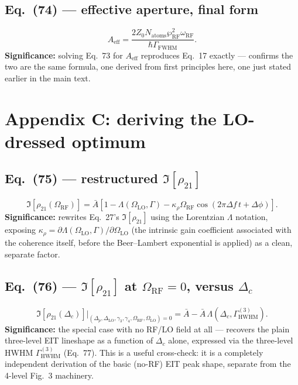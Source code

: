 \documentclass[11pt]{article}
\begin{document}
\subsection*{Eq.~(74) --- effective aperture, final form}
\begin{equation}
A_\text{eff} = \frac{2Z_0N_\text{atoms}\wp_\text{RF}^2\omega_\text{RF}}{\hbar\Gamma_\text{FWHM}}. \tag{74}
\end{equation}
\textbf{Significance:} solving Eq.~73 for $A_\text{eff}$ reproduces
Eq.~17 exactly --- confirms the two are the same formula, one derived
from first principles here, one just stated earlier in the main text.

\section{Appendix C: deriving the LO-dressed optimum}

\subsection*{Eq.~(75) --- restructured $\Im[\rho_{21}]$}
\begin{equation}
\Im[\rho_{21}(\Omega_\text{RF})] = \bar A[1-\Lambda(\Omega_\text{LO},\Gamma)-\kappa_\rho\Omega_\text{RF}\cos(2\pi\Delta f\,t+\Delta\phi)]. \tag{75}
\end{equation}
\textbf{Significance:} rewrites Eq.~27's $\Im[\rho_{21}]$ using the
Lorentzian $\Lambda$ notation, exposing $\kappa_\rho=\partial\Lambda(\Omega_\text{LO},\Gamma)/\partial\Omega_\text{LO}$
(the intrinsic gain coefficient associated with the coherence itself,
before the Beer--Lambert exponential is applied) as a clean, separate
factor.

\subsection*{Eq.~(76) --- $\Im[\rho_{21}]$ at $\Omega_\text{RF}=0$, versus $\Delta_c$}
\begin{equation}
\Im[\rho_{21}(\Delta_c)]\big|_{(\Delta_p,\Delta_\text{LO},\gamma_3,\gamma_4,\Omega_\text{RF},\Omega_\text{LO})=0}
= \bar A-\bar A\,\Lambda\!\left(\Delta_c,\Gamma_\text{HWHM}^{(3)}\right). \tag{76}
\end{equation}
\textbf{Significance:} the special case with no RF/LO field at all ---
recovers the plain three-level EIT lineshape as a function of $\Delta_c$
alone, expressed via the three-level HWHM $\Gamma_\text{HWHM}^{(3)}$
(Eq.~77). This is a useful cross-check: it is a completely independent
derivation of the basic (no-RF) EIT peak shape, separate from the
4-level Fig.~3 machinery.
\end{document}
